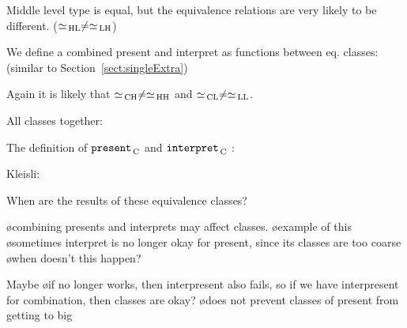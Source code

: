 Middle level type is equal, but the equivalence relations are very likely to be different. ($\simeq_{\, \mathrm {HL}} \neq \simeq_{\, \mathrm {LH}}$)

We define a combined present and interpret as functions between eq. classes: (similar to Section~\ref{sect:singleExtra})


Again it is likely that  $\simeq_{\, \mathrm {CH}} \neq \simeq_{\, \mathrm {HH}}$ and $\simeq_{\, \mathrm {CL}} \neq \simeq_{\, \mathrm {LL}}$.


All classes together:

The definition of ${\tt present}_{\, \mathrm C}$ and ${\tt interpret}_{\, \mathrm C}$ : 


Kleisli:


When are the results of these equivalence classes?


\bl
\o combining presents and interprets may affect classes. 
\o example of this
\o sometimes interpret is no longer okay for present, since its classes are too coarse
\o when doesn't this happen?
\el

Maybe
\bl
\o if no longer works, then interpresent also fails, so if we have interpresent for combination, then classes are okay? 
\o does not prevent classes of present from getting to big
\el

